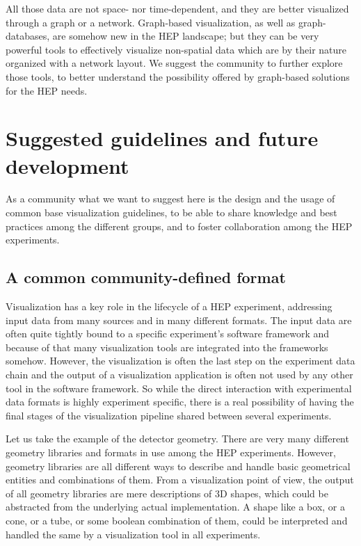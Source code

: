 \documentclass[12pt,a4paper]{article}
\begin{document}
All those data are not space- nor time-dependent, and they are better visualized through a graph or a network. Graph-based visualization,
as well as graph-databases, are somehow new in the HEP landscape; but they can be very powerful tools to effectively visualize
non-spatial data which are by their nature organized with a network layout. We suggest the community to further explore those tools,
to better understand the possibility offered by graph-based solutions for the HEP needs.



\hypertarget{suggested-guidelines}{%
\section{Suggested guidelines and future development}\label{suggested-guidelines}}

As a community what we want to suggest here is the design and the usage of common base visualization guidelines,
to be able to share knowledge and best practices among the different groups, and to foster collaboration among the HEP experiments.

\hypertarget{common-format}{%
\subsection{A common community-defined format}\label{common-format}}

Visualization has a key role in the lifecycle of a HEP experiment, addressing input data from many sources and in many different formats.
The input data are often quite tightly bound to a specific experiment's software framework and because of that many visualization tools
are integrated into the frameworks somehow. However, the visualization is often the last step on the experiment data chain and the
output of a visualization application is often not used by any other tool in the software framework. So while the direct interaction with experimental data
formats is highly experiment specific, there is a real possibility of having the final stages of the visualization pipeline
shared between several experiments.

Let us take the example of the detector geometry. There are very many different geometry libraries and formats in use among the HEP experiments.
However, geometry libraries are all different ways to describe and handle basic geometrical entities and combinations of them.
From a visualization point of view, the output of all geometry libraries are mere descriptions of 3D shapes, which could be abstracted
from the underlying actual implementation. A shape like a box, or a cone, or a tube, or some boolean combination of them, could be
interpreted and handled the same by a visualization tool in all experiments.
\end{document}
